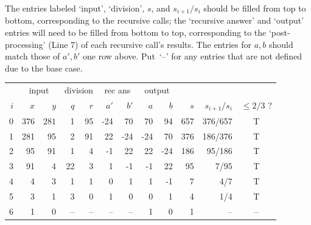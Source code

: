 \documentclass[11pt,addpoints]{exam}
\begin{document}
\begin{questions}
\begin{parts}
    The entries labeled `input', `division', $s$, and $s_{i+1}/s_i$ should be filled from top to bottom, corresponding to the recursive calls; the `recursive answer' and `output' entries will need to be filled from bottom to top, corresponding to the `post-processing' (Line 7) of each recursive call's results.
    The entries for $a,b$ should match those of $a',b'$ one row above.
    Put~`--' for any entries that are not defined due to the base case.

    \begin{solution}
      \begin{table}[H]\centering
        \begin{tabular}{r|rr|rr|rr|rr|rrc}
          & \multicolumn{2}{c|}{input} & \multicolumn{2}{|c|}{division} & \multicolumn{2}{|c|}{rec ans} & \multicolumn{2}{|c|}{output} \\
          $i$ & $x$   & $y$  & $q$ & $r$  & $a'$ & $b'$ & $a$ & $b$ & $s$ & $s_{i+1}/s_{i}$ & $\leq 2/3$ ? \\ \hline
          $0$ & $376$ & $281$ & 1 & 95 & -24 & 70 & 70 & 94 & 657 & 376/657 & T \\
          1 & 281 & 95 & 2 & 91 & 22 & -24 & -24 & 70 & 376 & 186/376 & T \\
          2 & 95 & 91 & 1 & 4 & -1 & 22 & 22 & -24 & 186 & 95/186 & T \\
          3 & 91 & 4 & 22 & 3 & 1 & -1 & -1 & 22 & 95 & 7/95 & T \\
          4 & 4 & 3 & 1 & 1 & 0 & 1 & 1 & -1 & 7 & 4/7 & T \\
          5 & 3 & 1 & 3 & 0 & 1 & 0 & 0 & 1 & 4 & 1/4 & T \\
          6 & 1 & 0 & -- & -- & -- & -- & 1 & 0 & 1 & -- & -- \\
        \end{tabular}
      \end{table}
    \end{solution}
  \end{parts}




\end{questions}
\end{document}
